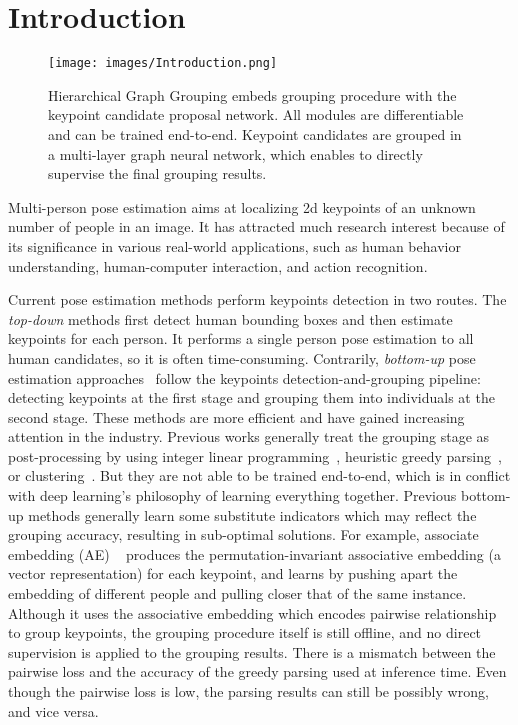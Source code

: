 \documentclass[runningheads]{llncs}
\begin{document}
\section{Introduction}
	
	\begin{figure}
		\begin{center}
			\texttt{[image: images/Introduction.png]}
		\end{center}
		\caption{ Hierarchical Graph Grouping embeds grouping procedure with the keypoint candidate proposal network. All modules are differentiable and can be trained end-to-end. Keypoint candidates are grouped in a multi-layer graph neural network, which enables to directly supervise the final grouping results. }
		\label{fig:motivation}
	\end{figure}
	
	Multi-person pose estimation aims at localizing 2d keypoints of an unknown number of people in an image. It has attracted much research interest because of its significance in various real-world applications, such as human behavior understanding, human-computer interaction, and action recognition.
	
	Current pose estimation methods perform keypoints detection in two routes. The \emph{top-down} methods  \cite{chen2018cascaded,he2017mask,li2019crowdpose,papandreou2017towards,sun2019deep,sun2018integral,xiao2018simple} first detect human bounding boxes and then estimate keypoints for each person. It performs a single person pose estimation to all human candidates, so it is often time-consuming.
	Contrarily, \emph{bottom-up} pose estimation approaches~\cite{cao2017realtime,jin2019multi,newell2017associative,papandreou2018personlab} follow the keypoints detection-and-grouping pipeline: detecting keypoints at the first stage and grouping them into individuals at the second stage. These methods are more efficient and have gained increasing attention in the industry. 
	Previous works generally treat the grouping stage as post-processing by using integer linear programming~\cite{Insafutdinov2016ArtTrack,Insafutdinov2016DeeperCut,jin2017towards,pishchulin2016deepcut}, heuristic greedy parsing~\cite{cao2017realtime,papandreou2018personlab}, or clustering~\cite{newell2017associative,nie2017generative}. But they are not able to be trained end-to-end, which is in conflict with deep learning’s philosophy of learning everything together. Previous bottom-up methods generally learn some substitute indicators which may reflect the grouping accuracy, resulting in sub-optimal solutions. 
	For example, associate embedding (AE) ~\cite{newell2017associative} produces the permutation-invariant associative embedding (a vector representation) for each keypoint, and learns by pushing apart the embedding of different people and pulling closer that of the same instance. Although it uses the associative embedding which encodes pairwise relationship to group keypoints, the grouping procedure itself is still offline, and no direct supervision is applied to the grouping results. There is a mismatch between the pairwise loss and the accuracy of the greedy parsing used at inference time. Even though the pairwise loss is low, the parsing results can still be possibly wrong, and vice versa. 
	
\end{document}
